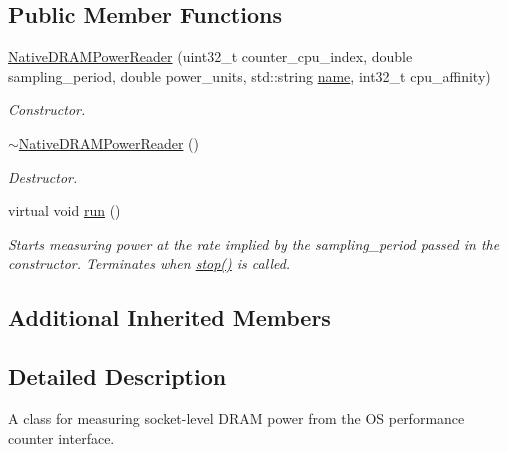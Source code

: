 \subsection*{Public Member Functions}
\begin{DoxyCompactItemize}
\item 
\hyperlink{classxmem_1_1power_1_1_native_d_r_a_m_power_reader_a825b2e2e2a92c1c31f7e252bb5402e32}{Native\+D\+R\+A\+M\+Power\+Reader} (uint32\+\_\+t counter\+\_\+cpu\+\_\+index, double sampling\+\_\+period, double power\+\_\+units, std\+::string \hyperlink{classxmem_1_1power_1_1_power_reader_ac0f465b044512502eb1824f18d60e3e6}{name}, int32\+\_\+t cpu\+\_\+affinity)
\begin{DoxyCompactList}\small\item\em Constructor. \end{DoxyCompactList}\item 
\hypertarget{classxmem_1_1power_1_1_native_d_r_a_m_power_reader_a7b6049c41515c227cd23c815d60edb43}{}\hyperlink{classxmem_1_1power_1_1_native_d_r_a_m_power_reader_a7b6049c41515c227cd23c815d60edb43}{$\sim$\+Native\+D\+R\+A\+M\+Power\+Reader} ()\label{classxmem_1_1power_1_1_native_d_r_a_m_power_reader_a7b6049c41515c227cd23c815d60edb43}

\begin{DoxyCompactList}\small\item\em Destructor. \end{DoxyCompactList}\item 
\hypertarget{classxmem_1_1power_1_1_native_d_r_a_m_power_reader_acf3e518e39c8b90f759c674a2c81d985}{}virtual void \hyperlink{classxmem_1_1power_1_1_native_d_r_a_m_power_reader_acf3e518e39c8b90f759c674a2c81d985}{run} ()\label{classxmem_1_1power_1_1_native_d_r_a_m_power_reader_acf3e518e39c8b90f759c674a2c81d985}

\begin{DoxyCompactList}\small\item\em Starts measuring power at the rate implied by the sampling\+\_\+period passed in the constructor. Terminates when \hyperlink{classxmem_1_1power_1_1_power_reader_a5c28efc4aece34a5469d067a133920f4}{stop()} is called. \end{DoxyCompactList}\end{DoxyCompactItemize}
\subsection*{Additional Inherited Members}


\subsection{Detailed Description}
A class for measuring socket-\/level D\+R\+A\+M power from the O\+S performance counter interface. 

